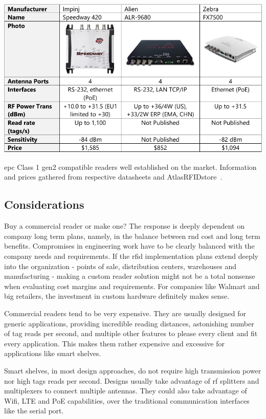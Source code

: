 \begin{table}
    \centering
    \includegraphics[width=\linewidth]{./figs/02-state-of-the-art/table_commercialreaders.pdf}
    \caption[\ac{epc} Class 1 \ac{gen2} compatible readers well established on the market]{\ac{epc} Class 1 \ac{gen2} compatible readers well established on the market. Information and prices gathered from respective datasheets and AtlasRFIDstore~\cite{AtlasRFIDstoreBuyRFID}.}
    \label{tab:readercommercialsolutions}
\end{table}

\subsection{Considerations}

Buy a commercial reader or make one?
The response is deeply dependent on company long term plans, namely, in the balance between \ac{rnd} cost and long term benefits. Compromises in engineering work have to be clearly balanced with the company needs and requirements. If the \ac{rfid} implementation plans extend deeply into the organization - points of sale, distribution centers, warehouses and manufacturing - making a custom reader solution might not be a total nonsense when evaluating cost margins and requirements. For companies like Walmart and big retailers, the investment in custom hardware definitely makes sense.

Commercial readers tend to be very expensive. They are usually designed for generic applications, providing incredible reading distances, astonishing number of tag reads per second, and multiple other features to please every client and fit every application.
This makes them rather expensive and excessive for applications like smart shelves.

Smart shelves, in most design approaches, do not require high transmission power nor high tags reads per second. Designs usually take advantage of \ac{rf} splitters and multiplexers to connect multiple antennas. They could also take advantage of Wifi, LTE and PoE capabilities, over the traditional communication interfaces like the serial port.


